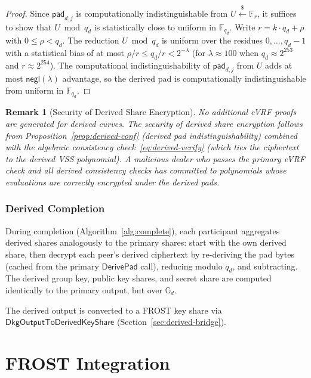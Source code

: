 \documentclass[11pt,a4paper]{article}
\newtheorem{remark}{Remark}[section]
\newcommand{\F}{\mathbb{F}}
\newcommand{\G}{\mathbb{G}}
\newcommand{\Fr}{\F_r}
\newcommand{\pad}{\mathsf{pad}}
\newcommand{\negl}{\mathsf{negl}}
\newcommand{\getsr}{\xleftarrow{\$}}
\begin{document}
\begin{proof}
  Since $\pad_{d,j}$ is computationally indistinguishable from $U \getsr \Fr$,
  it suffices to show that $U \bmod q_d$ is statistically close to uniform in
  $\F_{q_d}$. Write $r = k \cdot q_d + \rho$ with $0 \le \rho < q_d$. The
  reduction $U \bmod q_d$ is uniform over the residues $0, \ldots, q_d - 1$
  with a statistical bias of at most $\rho / r \le q_d / r < 2^{-\lambda}$
  (for $\lambda \approx 100$ when $q_d \approx 2^{253}$ and $r \approx 2^{254}$).
  The computational indistinguishability of $\pad_{d,j}$ from $U$ adds at most
  $\negl(\lambda)$ advantage, so the derived pad is computationally
  indistinguishable from uniform in $\F_{q_d}$.
\end{proof}

\begin{remark}[Security of Derived Share Encryption]
  No additional eVRF proofs are generated for derived curves. The security of
  derived share encryption follows from Proposition~\ref{prop:derived-conf}
  (derived pad indistinguishability) combined with the algebraic consistency
  check~\eqref{eq:derived-verify} (which ties the ciphertext to the derived
  VSS polynomial). A malicious dealer who passes the primary eVRF check and
  all derived consistency checks has committed to polynomials whose evaluations
  are correctly encrypted under the derived pads.
\end{remark}

\subsubsection{Derived Completion}

During completion (Algorithm~\ref{alg:complete}), each participant aggregates
derived shares analogously to the primary shares: start with the own derived
share, then decrypt each peer's derived ciphertext by re-deriving the pad bytes
(cached from the primary $\mathsf{DerivePad}$ call), reducing modulo $q_d$,
and subtracting. The derived group key, public key shares, and secret share are
computed identically to the primary output, but over $\G_d$.

The derived output is converted to a FROST key share via
$\mathsf{DkgOutputToDerivedKeyShare}$ (Section~\ref{sec:derived-bridge}).

\section{FROST Integration}
\label{sec:frost}
\end{document}
